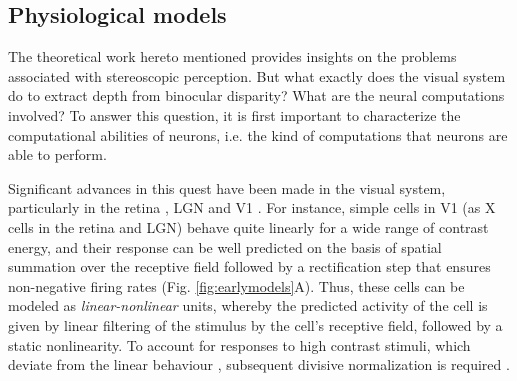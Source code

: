 




\subsection{Physiological models}


The theoretical work hereto mentioned provides insights on the problems associated with stereoscopic perception. But what exactly does the visual system do to extract depth from binocular disparity? What are the neural computations involved? To answer this question, it is first important to characterize the computational abilities of neurons, i.e. the kind of computations that neurons are able to perform. 

Significant advances in this quest have been made in the visual system, particularly in the retina \cite{Enroth-Cugell:1966zr}, LGN \cite{Shapley:1975aa} and V1 \cite{Movshon:1978dq}. For instance, simple cells in V1 (as X cells in the retina and LGN) behave quite linearly for a wide range of contrast energy, and their response can be well predicted on the basis of spatial summation over the receptive field followed by a rectification step that ensures non-negative firing rates \cite{Movshon:1978dq} (Fig. \ref{fig:earlymodels}A). Thus, these cells can be modeled as \textit{linear-nonlinear} units, whereby the predicted activity of the cell is given by linear filtering of the stimulus by the cell's receptive field, followed by a static nonlinearity. To account for responses to high contrast stimuli, which deviate from the linear behaviour \cite{Maffei:1973aa}, subsequent divisive normalization is required \cite{Carandini97linearityand}.

